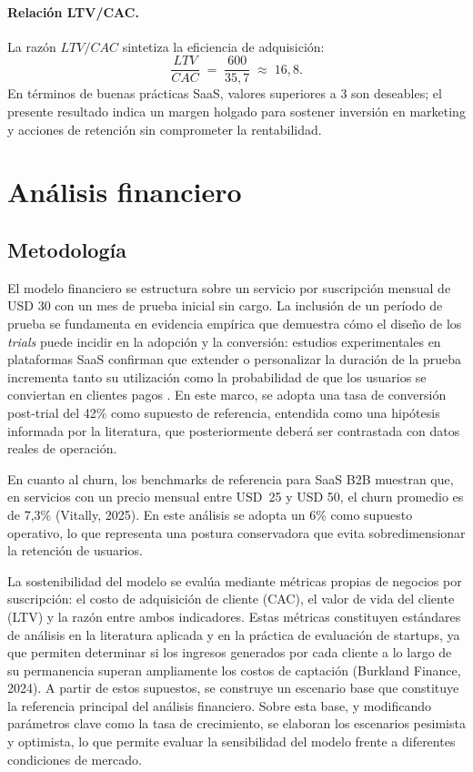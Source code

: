 \paragraph{Relación LTV/CAC.}
La razón $LTV/CAC$ sintetiza la eficiencia de adquisición:
\[
\frac{LTV}{CAC} \;=\; \frac{600}{35{,}7} \;\approx\; 16{,}8.
\]
En términos de buenas prácticas SaaS, valores superiores a 3 son deseables; el presente resultado indica un margen holgado para sostener inversión en marketing y acciones de retención sin comprometer la rentabilidad.



\section{Análisis financiero}

\subsection{Metodología}

El modelo financiero se estructura sobre un servicio por suscripción mensual de USD 30 con un mes de prueba inicial sin cargo. La inclusión de un período de prueba se fundamenta en evidencia empírica que demuestra cómo el diseño de los \emph{trials} puede incidir en la adopción y la conversión: estudios experimentales en plataformas SaaS confirman que extender o personalizar la duración de la prueba incrementa tanto su utilización como la probabilidad de que los usuarios se conviertan en clientes pagos \parencite{zhang2025}. En este marco, se adopta una tasa de conversión post-trial del 42\% como supuesto de referencia, entendida como una hipótesis informada por la literatura, que posteriormente deberá ser contrastada con datos reales de operación.

En cuanto al churn, los benchmarks de referencia para SaaS B2B muestran que, en servicios con un precio mensual entre USD~25 y USD 50, el churn promedio es de 7,3\% (Vitally, 2025). En este análisis se adopta un 6\% como supuesto operativo, lo que representa una postura conservadora que evita sobredimensionar la retención de usuarios.



La sostenibilidad del modelo se evalúa mediante métricas propias de negocios por suscripción: el costo de adquisición de cliente (CAC), el valor de vida del cliente (LTV) y la razón entre ambos indicadores. Estas métricas constituyen estándares de análisis en la literatura aplicada y en la práctica de evaluación de startups, ya que permiten determinar si los ingresos generados por cada cliente a lo largo de su permanencia superan ampliamente los costos de captación (Burkland Finance, 2024). A partir de estos supuestos, se construye un escenario base que constituye la referencia principal del análisis financiero. Sobre esta base, y modificando parámetros clave como la tasa de crecimiento, se elaboran los escenarios pesimista y optimista, lo que permite evaluar la sensibilidad del modelo frente a diferentes condiciones de mercado.



